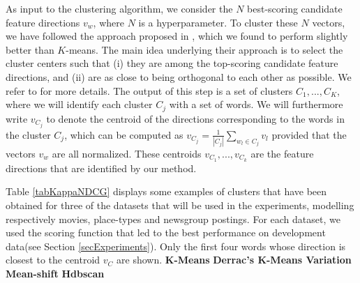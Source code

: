 \documentclass{article}
\begin{document}
As input to the clustering algorithm, we consider the $N$ best-scoring candidate feature directions $v_w$, where $N$ is a hyperparameter. To cluster these $N$ vectors, we have followed the approach proposed in \cite{derracAIJ}, which we found to perform slightly better than $K$-means. The main idea underlying their approach is to select the cluster centers such that (i) they are among the top-scoring candidate feature directions, and (ii) are as close to being orthogonal to each other as possible. We refer to \cite{derracAIJ} for more details. 
The output of this step is a set of clusters $C_1,...,C_K$, where we will identify each cluster $C_j$ with a set of words.
We will furthermore write $v_{C_j}$ to denote the centroid of the directions corresponding to the words in the cluster $C_j$, which can be computed as $v_{C_j}= \frac{1}{|C_j|} \sum_{w_l\in C_j} v_l$ provided that the vectors $v_w$ are all normalized. These centroids $v_{C_1},...,v_{C_k}$ are the feature directions that are identified by our method. 

Table \ref{tabKappaNDCG} displays some examples of clusters that have been obtained for three of the datasets that will be used in the experiments, modelling respectively movies, place-types and newsgroup postings. For each dataset, we used the scoring function that led to the best performance on development data(see Section \ref{secExperiments}). Only the first four words whose direction is closest to the centroid $v_C$ are shown.
\noindent \textbf{K-Means}
\noindent \textbf{Derrac's K-Means Variation}
\noindent \textbf{Mean-shift}
\noindent \textbf{Hdbscan}

\end{document}

